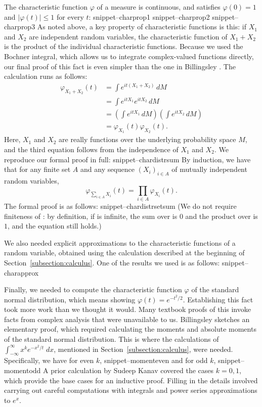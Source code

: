 \documentclass{svjour3}
\newcommand{\ph}{\varphi}
\newcommand{\Snippet}[1]{\csname snippet--#1\endcsname}
\begin{document}
The characteristic function $\ph$ of a measure is continuous, and satisfies $\ph(0) = 1$ and $|\ph(t)| \leq 1$ for every $t$:
\Snippet{charprop1}
\Snippet{charprop2}
\Snippet{charprop3}
As noted above, a key property of characteristic functions is this: if $X_1$ and $X_2$ are independent random variables, the characteristic function of $X_1 + X_2$ is the product of the individual characteristic functions. Because we used the Bochner integral, which allows us to integrate complex-valued functions directly, our final proof of this fact is even simpler than the one in Billingsley \cite{billingsley:95}. The calculation runs as follows:
\begin{align*}
\ph_{X_1 + X_2}(t) &= \int e^{i t (X_1 + X_2)} \, dM  \\
                   &= \int e^{i t X_1} e^{i t X_2} \, dM \\
                   &= \left(\int e^{i t X_1} \, dM\right) \left(\int e^{i t X_2} \, dM\right) \\
                   &= \ph_{X_1}(t) \ph_{X_2}(t).
\end{align*}
Here, $X_1$ and $X_2$ are really functions over the underlying probability space $M$, and the third equation follows from the independence of $X_1$ and $X_2$. We reproduce our formal proof in full:
\Snippet{chardistrsum}
By induction, we have that for any finite set $A$ and any sequence $(X_i)_{i \in A}$ of mutually independent random variables,
\[
\ph_{\sum_{i \in A} X_i}(t) = \prod_{i \in A} \ph_{X_i}(t).
\]
The formal proof is as follows:
\Snippet{chardistrsetsum}
(We do not require finiteness of : by definition, if  is infinite, the sum over  is $0$ and the product over  is $1$, and the equation still holds.)

We also needed explicit approximations to the characteristic functions of a random variable, obtained using the calculation described at the beginning of Section~\ref{subsection:calculus}. One of the results we used is as follows:
\Snippet{charapprox}

Finally, we needed to compute the characteristic function $\ph$ of the standard normal distribution, which means showing $\ph(t) = e^{-t^2/2}$. Establishing this fact took more work than we thought it would. Many textbook proofs of this invoke facts from complex analysis that were unavailable to us. Billingsley \cite[page 344]{billingsley:95} sketches an elementary proof, which required calculating the moments and absolute moments of the standard normal distribution. This is where the calculations of $\int_{-\infty}^\infty x^k e^{-x^2 / t} \; dx$, mentioned in Section~\ref{subsection:calculus}, were needed. Specifically, we have for even $k$,
\Snippet{momenteven}
and for odd $k$,
\Snippet{momentodd}
A prior calculation by Sudeep Kanav covered the cases $k = 0, 1$, which provide the base cases for an inductive proof. Filling in the details involved carrying out careful computations with integrals and power series approximations to $e^x$.
\end{document}
